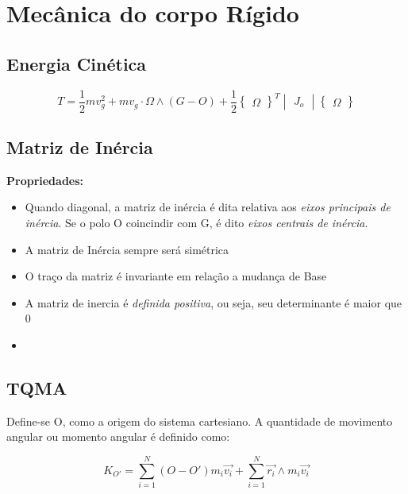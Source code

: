 \section{Mecânica do corpo Rígido}

\subsection{Energia Cinética}

$$\boxed{T = \frac{1}{2}mv_g^2 + mv_g \cdot \Omega \wedge (G-O)  + \frac{1}{2} \begin{Bmatrix} \Omega \end{Bmatrix}^T \begin{vmatrix}  J_o\end{vmatrix} \begin{Bmatrix} \Omega \end{Bmatrix}}$$

\subsection{Matriz de Inércia}

\textbf{Propriedades:}

\begin{itemize}
	\item Quando diagonal, a matriz de inércia é dita relativa aos \textit{eixos principais de inércia}. Se o polo O coincindir com G, é dito \textit{eixos centrais de inércia}.
	\item A matriz de Inércia sempre será simétrica
	\item O traço da matriz é invariante em relação a mudança de Base
	\item A matriz de inercia é \textit{definida positiva}, ou seja, seu determinante é maior que 0
	\item 
\end{itemize}

\subsection{TQMA}

Define-se O, como a origem do sistema cartesiano.
A quantidade de movimento angular ou momento angular é definido como:

\begin{namedtheorem}
$$K_{O'} = \sum_{i=1}^{N}(O-O')m_i\vec{v_i} + \sum_{i=1}^{N}\vec{r_i}\wedge m_i\vec{v_i} $$
\end{namedtheorem}

